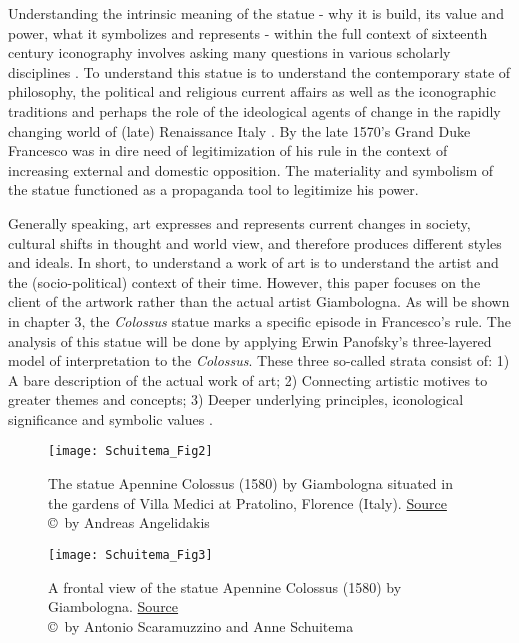 Understanding the intrinsic meaning of the statue - why it is build, its value and power, what it symbolizes and represents - within the full context of sixteenth century iconography involves asking many questions in various scholarly disciplines \parencites[16]{Panofsky1963}. To understand this statue is to understand the contemporary state of philosophy, the political and religious current affairs as well as the iconographic traditions and perhaps the role of the ideological agents of change in the rapidly changing world of (late) Renaissance Italy \parencites[1]{Petersen2011}. By the late 1570’s Grand Duke Francesco was in dire need of legitimization of his rule in the context of increasing external and domestic opposition. The materiality and symbolism of the statue functioned as a propaganda tool to legitimize his power.

Generally speaking, art expresses and represents current changes in society, cultural shifts in thought and world view, and therefore produces different styles and ideals. In short, to understand a work of art is to understand the artist and the (socio-political) context of their time. However, this paper focuses on the client of the artwork rather than the actual artist Giambologna. As will be shown in chapter 3, the \textit{Colossus} statue marks a specific episode in Francesco’s rule. The analysis of this statue will be done by applying Erwin Panofsky’s three-layered model of interpretation to the \textit{Colossus}. These three so-called strata consist of: 1) A bare description of the actual work of art; 2) Connecting artistic motives to greater themes and concepts; 3) Deeper underlying principles, iconological significance and symbolic values \parencites[28-30]{Panofsky1955}.

 \begin{figure}[]
		\texttt{[image: Schuitema\_Fig2]}
	\caption{The statue Apennine Colossus (1580) by Giambologna situated in the gardens of Villa Medici at Pratolino, Florence (Italy). \href{https://www.boredpanda.com/appennino-sculpture-colossus-giambologna-florence-italy/}{Source}
		{\normalfont\scriptsize \\ \copyright\ by Andreas Angelidakis
	}}
		\label{fig:Fig2}

\end{figure}

 \begin{figure}[]
	\texttt{[image: Schuitema\_Fig3]}
	\centering
	\caption{A frontal view of the statue Apennine Colossus (1580) by Giambologna. 	\href{https://twistedsifter.com/2012/07/picture-of-the-day-the-statue-of-apennine-by-giambologna/}{Source}
		{\normalfont\scriptsize \\ \copyright\ by  Antonio Scaramuzzino and Anne Schuitema
	}}
	\label{fig:Fig3}

\end{figure}

